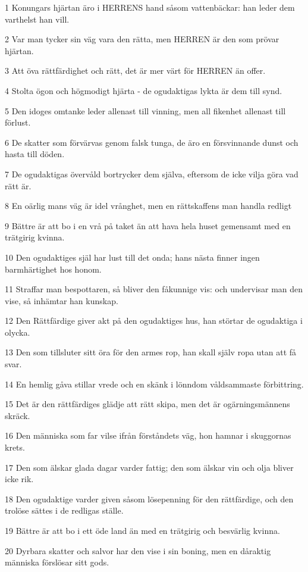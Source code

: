 \par 1 Konungars hjärtan äro i HERRENS hand såsom vattenbäckar: han leder dem varthelst han vill.
\par 2 Var man tycker sin väg vara den rätta, men HERREN är den som prövar hjärtan.
\par 3 Att öva rättfärdighet och rätt, det är mer värt för HERREN än offer.
\par 4 Stolta ögon och högmodigt hjärta - de ogudaktigas lykta är dem till synd.
\par 5 Den idoges omtanke leder allenast till vinning, men all fikenhet allenast till förlust.
\par 6 De skatter som förvärvas genom falsk tunga, de äro en försvinnande dunst och hasta till döden.
\par 7 De ogudaktigas övervåld bortrycker dem själva, eftersom de icke vilja göra vad rätt är.
\par 8 En oärlig mans väg är idel vrånghet, men en rättskaffens man handla redligt
\par 9 Bättre är att bo i en vrå på taket än att hava hela huset gemensamt med en trätgirig kvinna.
\par 10 Den ogudaktiges själ har lust till det onda; hans nästa finner ingen barmhärtighet hos honom.
\par 11 Straffar man bespottaren, så bliver den fåkunnige vis: och undervisar man den vise, så inhämtar han kunskap.
\par 12 Den Rättfärdige giver akt på den ogudaktiges hus, han störtar de ogudaktiga i olycka.
\par 13 Den som tillsluter sitt öra för den armes rop, han skall själv ropa utan att få svar.
\par 14 En hemlig gåva stillar vrede och en skänk i lönndom våldsammaste förbittring.
\par 15 Det är den rättfärdiges glädje att rätt skipa, men det är ogärningsmännens skräck.
\par 16 Den människa som far vilse ifrån förståndets väg, hon hamnar i skuggornas krets.
\par 17 Den som älskar glada dagar varder fattig; den som älskar vin och olja bliver icke rik.
\par 18 Den ogudaktige varder given såsom lösepenning för den rättfärdige, och den trolöse sättes i de redligas ställe.
\par 19 Bättre är att bo i ett öde land än med en trätgirig och besvärlig kvinna.
\par 20 Dyrbara skatter och salvor har den vise i sin boning, men en dåraktig människa förslösar sitt gods.
